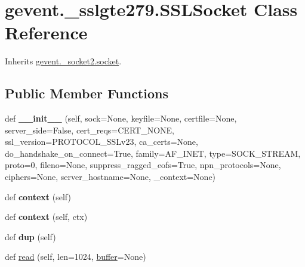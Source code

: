 \hypertarget{classgevent_1_1__sslgte279_1_1_s_s_l_socket}{}\section{gevent.\+\_\+sslgte279.\+S\+S\+L\+Socket Class Reference}
\label{classgevent_1_1__sslgte279_1_1_s_s_l_socket}


Inherits \hyperlink{classgevent_1_1__socket2_1_1socket}{gevent.\+\_\+socket2.\+socket}.

\subsection*{Public Member Functions}
\begin{DoxyCompactItemize}
\item 
\mbox{\label{classgevent_1_1__sslgte279_1_1_s_s_l_socket_a1d94cbb176374f477ede2a9039ebc153}} 
def {\bfseries \+\_\+\+\_\+init\+\_\+\+\_\+} (self, sock=None, keyfile=None, certfile=None, server\+\_\+side=False, cert\+\_\+reqs=C\+E\+R\+T\+\_\+\+N\+O\+NE, ssl\+\_\+version=P\+R\+O\+T\+O\+C\+O\+L\+\_\+\+S\+S\+Lv23, ca\+\_\+certs=None, do\+\_\+handshake\+\_\+on\+\_\+connect=True, family=A\+F\+\_\+\+I\+N\+ET, type=S\+O\+C\+K\+\_\+\+S\+T\+R\+E\+AM, proto=0, fileno=None, suppress\+\_\+ragged\+\_\+eofs=True, npn\+\_\+protocols=None, ciphers=None, server\+\_\+hostname=None, \+\_\+context=None)
\item 
\mbox{\label{classgevent_1_1__sslgte279_1_1_s_s_l_socket_a66e72c73646dbde45d0d189faf00bf03}} 
def {\bfseries context} (self)
\item 
\mbox{\label{classgevent_1_1__sslgte279_1_1_s_s_l_socket_aec8a44eec7ed3b6a519587b34308ac13}} 
def {\bfseries context} (self, ctx)
\item 
\mbox{\label{classgevent_1_1__sslgte279_1_1_s_s_l_socket_acd82cf200028e799115fa4af3b059e68}} 
def {\bfseries dup} (self)
\item 
def \hyperlink{classgevent_1_1__sslgte279_1_1_s_s_l_socket_a9636c7efdff4b4dc52cb2fe6f87b8dd7}{read} (self, len=1024, \hyperlink{structbuffer}{buffer}=None)
\item 

\end{DoxyCompactItemize}
